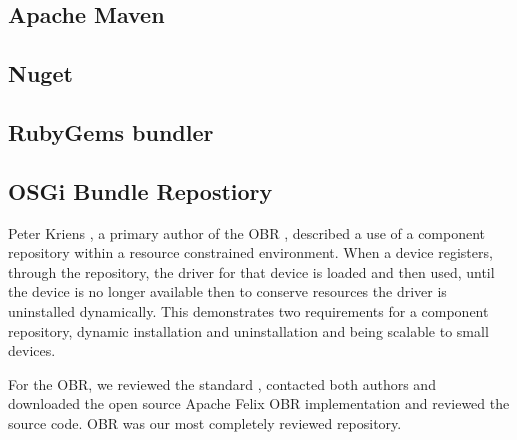 \subsection{Apache Maven}

\subsection{Nuget} 

\subsection{RubyGems bundler}


\subsection{OSGi Bundle Repostiory}
Peter Kriens \cite{kriens_osgi_2008}, 
a primary author of the OBR \cite{the_osgi_alliance_rfc-0112_2006}, described a use of a component repository within a resource constrained environment.
When a device registers, 
through the repository, the driver for that device is loaded and then used, until the device is no longer available
then to conserve resources the driver is uninstalled dynamically. 
This demonstrates two requirements for a component repository, dynamic installation and uninstallation and being scalable to small devices.

For the OBR, we reviewed the standard \cite{the_osgi_alliance_rfc-0112_2006}, 
contacted both authors \cite{kriens_osgi_2008, richard_s._hall_obr_2008} 
and downloaded the open source Apache Felix OBR implementation and reviewed the source code.
OBR was our most completely reviewed repository.


